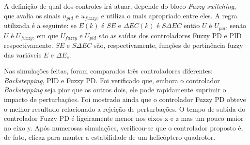 A definição de qual dos controles irá atuar, depende do bloco \textit{Fuzzy switching}, que avalia os sinais $u_{pid}$ e $u_{fuzzy}$, e utiliza o mais apropriado entre eles. A regra utilizada é a seguinte: se $E(k)$ é $SE$ e $\Delta EC(k)$ é $S\Delta EC$ então $U$ é $U_{pid}$, senão $U$ é $U_{fuzzy}$, em que $U_{fuzzy}$ e $U_{pid}$ são as saídas dos controladores Fuzzy PD e PID respectivamente. $SE$ e $S\Delta EC$ são, respectivamente, funções de pertinência fuzzy das variáveis $E$ e $\Delta E_c$.

Nas simulações feitas, foram comparados três controladores diferentes: \textit{Backstepping}, PID e Fuzzy PD. Foi verificado que, embora o controlador \textit{Backstepping} seja pior que os outros dois, ele pode rapidamente suprimir o impacto de perturbações. Foi mostrado ainda que o controlador Fuzzy PD obteve o melhor resultado relacionado a rejeição de perturbações. O tempo de subida do controlador Fuzzy PD é ligeiramente menor nos eixos x e z mas um pouco maior no eixo y. Após numerosas simulações, verificou-se que o controlador proposto é, de fato, eficaz para manter a estabilidade de um helicóptero quadrotor.

%


